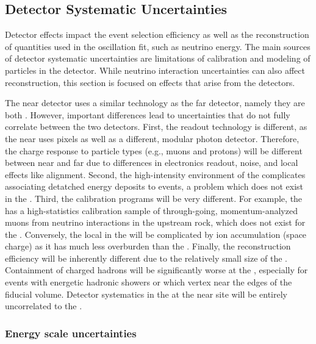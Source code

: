 \subsection{Detector Systematic Uncertainties}
\label{sec:detSysts}

Detector %
effects impact the event selection efficiency as well as the reconstruction of quantities used in the oscillation fit, such as neutrino energy. The main sources of detector systematic uncertainties are limitations of calibration and modeling of particles in the detector. While neutrino interaction uncertainties can also affect reconstruction, this section is focused on effects that arise from the detectors.

The near  detector uses a similar technology as the far detector, namely they are both . However, important differences lead to uncertainties that do not fully correlate between the two detectors. First, the readout technology is different, as the near  uses pixels as well as a different, modular photon detector. Therefore, the charge response to particle types (e.g., muons and protons) will be different between near and far due to differences in electronics readout, noise, and local effects like alignment.  Second, the high-intensity environment of the  complicates associating detatched energy deposits to events, a problem which does not exist in the . Third, the calibration programs will be very different. For example, the  has a high-statistics calibration sample of through-going, momentum-analyzed muons from neutrino interactions in the upstream rock, which does not exist for the . Conversely, the local \efield in the  will be complicated by ion accumulation (space charge) as it has much less overburden than the . Finally, the reconstruction efficiency will be inherently different due to the relatively small size of the . Containment of charged hadrons will be significantly worse at the , especially for events with energetic hadronic showers or which vertex near the edges of the fiducial volume. Detector systematics in the  at the near site will be entirely uncorrelated to the .

\subsubsection{Energy scale uncertainties}
\label{sec:EnergyScaleSysts}

